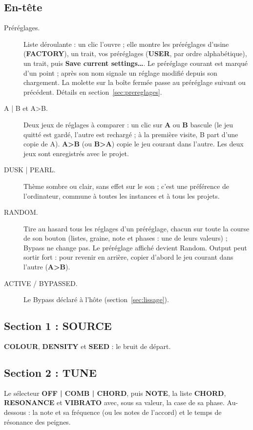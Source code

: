 \documentclass[a4paper,11pt]{article}
\newcommand{\ctl}[1]{\textsf{\textbf{#1}}}   %
\begin{document}
\subsection{En-tête}
\begin{description}
\item[Préréglages.] Liste déroulante : un clic l'ouvre ; elle montre les préréglages d'usine
  (\ctl{FACTORY}), un trait, vos préréglages (\ctl{USER}, par ordre alphabétique), un trait, puis
  \ctl{Save current settings\ldots}. Le préréglage courant est marqué d'un point ; \og *\fg{}
  après son nom signale un réglage modifié depuis son chargement. La molette sur la boîte fermée
  passe au préréglage suivant ou précédent. Détails en section~\ref{sec:prereglages}.
\item[A | B et A>B.] Deux jeux de réglages à comparer : un clic sur \ctl{A} ou \ctl{B} bascule
  (le jeu quitté est gardé, l'autre est rechargé ; à la première visite, B part d'une copie de
  A). \ctl{A>B} (ou \ctl{B>A}) copie le jeu courant dans l'autre. Les deux jeux sont
  enregistrés avec le projet.
\item[DUSK | PEARL.] Thème sombre ou clair, sans effet sur le son ; c'est une préférence de
  l'ordinateur, commune à toutes les instances et à tous les projets.
\item[RANDOM.] Tire au hasard tous les réglages d'un préréglage, chacun sur toute la course de
  son bouton (listes, graine, note et phases : une de leurs valeurs) ; Bypass ne change pas. Le
  préréglage affiché devient \og Random\fg. Output peut sortir fort : pour revenir en arrière,
  copier d'abord le jeu courant dans l'autre (\ctl{A>B}).
\item[ACTIVE / BYPASSED.] Le Bypass déclaré à l'hôte (section~\ref{sec:lissage}).
\end{description}

\subsection{Section 1 : SOURCE}
\ctl{COLOUR}, \ctl{DENSITY} et \ctl{SEED} : le bruit de départ.

\subsection{Section 2 : TUNE}
Le sélecteur \ctl{OFF | COMB | CHORD}, puis \ctl{NOTE}, la liste \ctl{CHORD}, \ctl{RESONANCE} et
\ctl{VIBRATO} avec, sous sa valeur, la case de sa phase. Au-dessous : la note et sa fréquence (ou
les notes de l'accord) et le temps de résonance des peignes.
\end{document}
